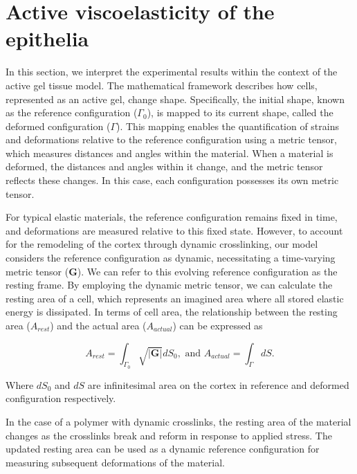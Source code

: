 \hypertarget{active-viscoelasticity-of-the-epithelia}{%
	\section{Active viscoelasticity of the
		epithelia}\label{active-viscoelasticity-of-the-epithelia}}
	
In this section, we interpret the experimental results within the context of the active gel tissue model. The mathematical framework describes how cells, represented as an active gel, change shape. Specifically, the initial shape, known as the reference configuration (\(\Gamma_{0}\)), is mapped to its current shape, called the deformed configuration (\(\Gamma\)). This mapping enables the quantification of strains and deformations relative to the reference configuration using a metric tensor, which measures distances and angles within the material. When a material is deformed, the distances and angles within it change, and the metric tensor reflects these changes. In this case, each configuration possesses its own metric tensor.

For typical elastic materials, the reference configuration remains fixed in time, and deformations are measured relative to this fixed state. However, to account for the remodeling of the cortex through dynamic crosslinking, our model considers the reference configuration as dynamic, necessitating a time-varying metric tensor  (\(\mathbf{G}\)). We can refer to this evolving reference configuration as the resting frame. By employing the dynamic metric tensor, we can calculate the resting area of a cell, which represents an imagined area where all stored elastic energy is dissipated. In terms of cell area, the relationship between the resting area (\(A_{rest}\)) and the actual area (\(A_{actual}\)) can be expressed as

\begin{equation}
	A_{rest} = \int_{\Gamma_0} \sqrt{|\mathbf{G}|}dS_0, \text{ and } A_{actual} = \int_{\Gamma}dS.
\end{equation}

Where $dS_{0}$ and $dS$ are infinitesimal area on the cortex in
reference and deformed configuration respectively.

In the case of a polymer with dynamic crosslinks, the resting area of the material changes as the crosslinks break and reform in response to applied stress. The updated resting area can be used as a dynamic reference configuration for measuring subsequent deformations of the material.

